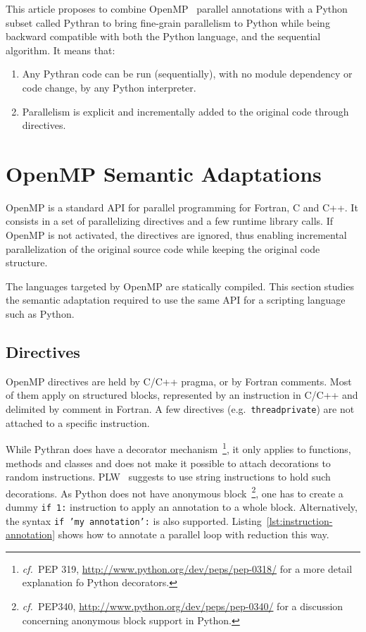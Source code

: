 \documentclass{llncs}
\newcommand\see{\emph{cf.\ }}
\begin{document}
This article proposes to combine OpenMP~\cite{openmp3.1} parallel annotations
with a Python subset called Pythran to bring fine-grain parallelism to Python
while being backward compatible with both the Python language, and the
sequential algorithm. It means that:
\begin{enumerate}
    \item Any Pythran code can be run (sequentially), with no module dependency or code change,
        by any Python interpreter.
    \item Parallelism is explicit and incrementally added to the original code
        through directives.
\end{enumerate}

\section{OpenMP Semantic Adaptations}\label{sec:python-openmp}

OpenMP is a standard API for parallel programming for Fortran, C and C++. It
consists in a set of parallelizing directives and a few runtime library calls.
If OpenMP is not activated, the directives are ignored, thus enabling
incremental parallelization of the original source code while keeping the
original code structure.

The languages targeted by OpenMP are statically compiled. This section studies
the semantic adaptation required to use the same API for a scripting language
such as Python.

\subsection{Directives}

OpenMP directives are held by C/C++ pragma, or by Fortran comments. Most of them apply
on structured blocks, represented by an instruction in C/C++ and delimited by
comment in Fortran. A few directives (e.g.\ \texttt{threadprivate}) are not
attached to a specific instruction.

While Pythran does have a decorator mechanism~\footnote{\see PEP 319,
\url{http://www.python.org/dev/peps/pep-0318/} for a more detail explanation fo
Python decorators.}, it only applies to functions, methods and classes and does
not make it possible to attach decorations to random instructions.
PLW~\cite{dongara2007} suggests to use string instructions to hold such
decorations. As Python does not have anonymous block~\footnote{\see PEP340,
    \url{http://www.python.org/dev/peps/pep-0340/} for a discussion concerning
anonymous block support in Python.}, one has to create a dummy \texttt{if 1:}
instruction to apply an annotation to a whole block. Alternatively, the syntax
\texttt{if 'my annotation':} is also supported.
Listing~\ref{lst:instruction-annotation} shows how to annotate a parallel loop
with reduction this way.
\end{document}
